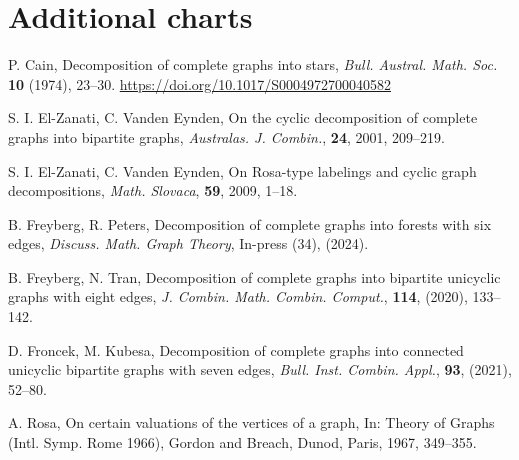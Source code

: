 \chapter{Additional charts}


\newpage

\newpage
    
    

    \begin{thebibliography}{20}
    
    P. Cain, 
    Decomposition of complete graphs into stars, 
    \textit{Bull. Austral. Math. Soc.} \textbf{10} (1974), 23--30.
    \url{https://doi.org/10.1017/S0004972700040582}
    
    S. I. El-Zanati, C. Vanden Eynden,
    On the cyclic decomposition of complete graphs into bipartite graphs,
    \textit{Australas. J. Combin.}, \textbf{24}, 2001, 209--219.
    
    S. I. El-Zanati, C. Vanden Eynden,
    On Rosa-type labelings and cyclic graph decompositions,
    \textit{Math. Slovaca}, \textbf{59}, 2009, 1--18.
    
    B. Freyberg, R. Peters, 
    Decomposition of complete graphs into forests with six edges, 
    \textit{Discuss. Math. Graph Theory}, In-press (34), (2024).
    
    B. Freyberg, N. Tran, 
    Decomposition of complete graphs into bipartite unicyclic graphs with eight edges, 
    \textit{J. Combin. Math. Combin. Comput.}, \textbf{114}, (2020), 133--142.
    
    D. Froncek, M. Kubesa, 
    Decomposition of complete graphs into connected unicyclic bipartite graphs with seven edges,
    \textit{Bull. Inst. Combin. Appl.}, \textbf{93}, (2021), 52--80.
    
    A. Rosa,
    On certain valuations of the vertices of a graph,
    In: Theory of Graphs (Intl. Symp. Rome 1966), Gordon and Breach, Dunod, Paris,
    1967, 349--355.
    
    \end{thebibliography}